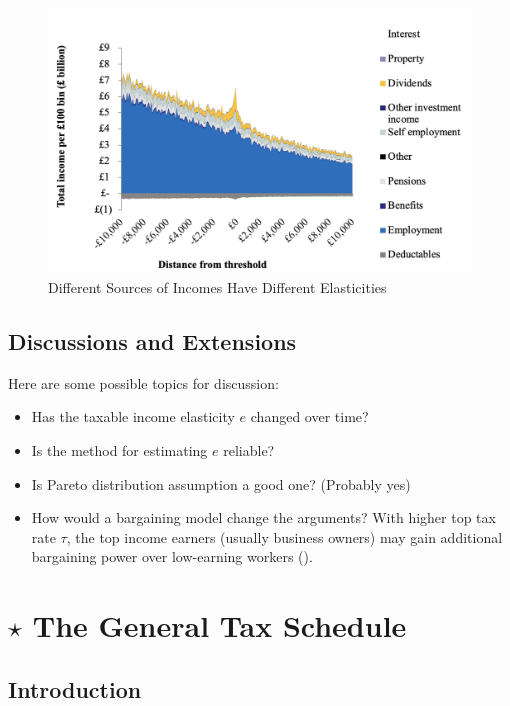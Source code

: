                 \begin{figure}[H]
                    \centering
                    \includegraphics[width=4.5in]{images/ch13/13_bunching_5.png}
                    \caption{Different Sources of Incomes Have Different Elasticities}
                \end{figure}


    \subsection{Discussions and Extensions}

        Here are some possible topics for discussion:
        \begin{itemize}
            \item Has the taxable income elasticity $e$ changed over time?
            \item Is the method for estimating $e$ reliable?
            \item Is Pareto distribution assumption a good one? (Probably yes)
            \item How would a bargaining model change the arguments? With higher top tax rate $\tau$, the top income earners (usually business owners) may gain additional bargaining power over low-earning workers (\cite{piketty_optimal_2014}).
        \end{itemize}


\section{$\star$ The General Tax Schedule}

    \subsection{Introduction}

